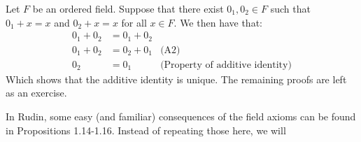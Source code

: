 \begin{nproof}
    Let $F$ be an ordered field. Suppose that there exist $0_1, 0_2 \in F$ such that $0_1 + x= x$ and $0_2 + x = x$ for all $x \in F$. We then have that:
    \begin{align*}
        0_1 + 0_2 &= 0_1 + 0_2
        \\ 0_1 + 0_2 &= 0_2 + 0_1 & \text{(A2)}
        \\ 0_2 &= 0_1 & \text{(Property of additive identity)}
    \end{align*}
    Which shows that the additive identity is unique. The remaining proofs are left as an exercise.
\end{nproof}
In Rudin, some easy (and familiar) consequences of the field axioms can be found in Propositions 1.14-1.16. Instead of repeating those here, we will 
